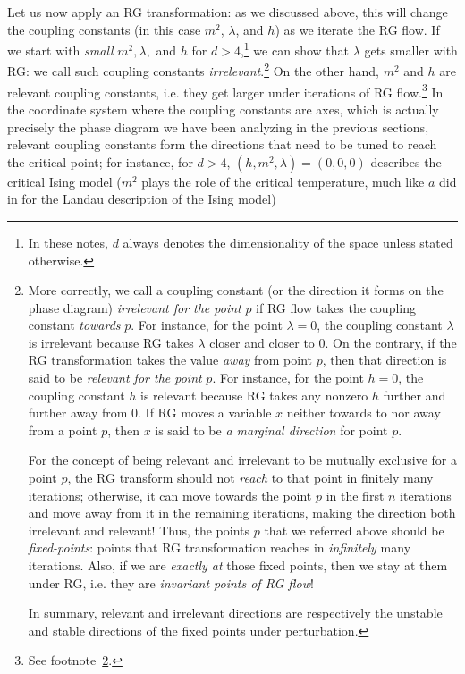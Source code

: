 Let us now apply an RG transformation: as we discussed above, this will change the coupling constants (in this case $m^2$, $\lambda$, and $h$) as we iterate the RG flow. If we start with \emph{small} $m^2,\lambda,$ and $h$ for $d>4$,\footnote{In these notes, $d$ always denotes the dimensionality of the space unless stated otherwise.} we can show that $\lambda$ gets smaller with RG: we call such coupling constants \emph{irrelevant}.\footnote{\label{footnote: relevant vs irrelevant}More correctly, we call a coupling constant (or the direction it forms on the phase diagram) \emph{irrelevant for the point} $p$ if RG flow takes the coupling constant \emph{towards} $p$. For instance, for the point $\lambda=0$, the coupling constant $\lambda$ is irrelevant because RG takes $\lambda$ closer and closer to $0$. On the contrary, if the RG transformation takes the value \emph{away} from point $p$, then that direction is said to be \emph{relevant for the point }$p$. For instance, for the point $h=0$, the coupling constant $h$ is relevant because RG takes any nonzero $h$ further and further away from $0$. If RG moves a variable $x$ neither towards to nor away from a point $p$, then $x$ is said to be \emph{a marginal direction} for point $p$.
	
	For the concept of being relevant and irrelevant to be mutually exclusive for a point $p$, the RG transform should not \emph{reach} to that point in finitely many iterations; otherwise, it can move towards the point $p$ in the first $n$ iterations and move away from it in the remaining iterations, making the direction both irrelevant and relevant! Thus, the points $p$ that we referred above should be \emph{fixed-points}: points that RG transformation reaches in \emph{infinitely} many iterations. Also, if we are \emph{exactly at} those fixed points, then we stay at them under RG, i.e. they are \emph{invariant points of RG flow}!
	
	
	In summary, relevant and irrelevant directions are respectively the unstable and stable directions of the fixed points under perturbation.
} On the other hand, $m^2$ and $h$ are relevant coupling constants, i.e. they get larger under iterations of RG flow.\footnote{See footnote~\ref{footnote: relevant vs irrelevant}.} In the coordinate system where the coupling constants are axes, which is actually precisely the phase diagram we have been analyzing in the previous sections, relevant coupling constants form the directions that need to be tuned to reach the critical point; for instance, for $d>4$, $(h,m^2,\lambda)=(0,0,0)$ describes the critical Ising model ($m^2$ plays the role of the critical temperature, much like $a$ did in  for the Landau description of the Ising model)
